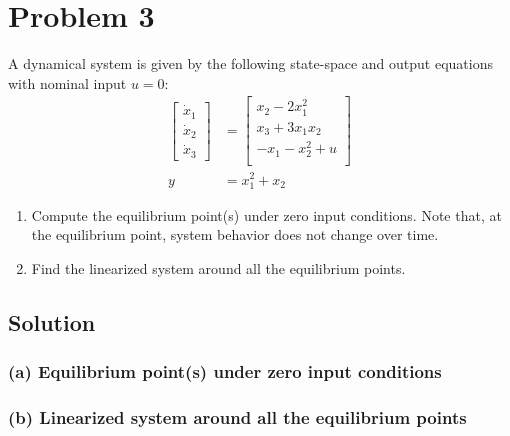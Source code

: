 \section*{Problem 3}

A dynamical system is given by the following state-space and output equations with nominal input \( u = 0\):
\begin{align*}
    \begin{bmatrix}
        \dot{x}_1 \\
        \dot{x}_2 \\
        \dot{x}_3
    \end{bmatrix}
      & =
    \begin{bmatrix}
        x_2 - 2 x_1^2    \\
        x_3 + 3 x_1 x_2  \\
        -x_1 - x_2^2 + u \\
    \end{bmatrix}
    \\
    y & = x_1^2 + x_2
\end{align*}

\begin{enumerate}[label= (\alph*)]
    \item Compute the equilibrium point(s) under zero input conditions.
          Note that, at the equilibrium point, system behavior does not change over time.
    \item Find the linearized system around all the equilibrium points.
\end{enumerate}

\subsection*{Solution}

\subsubsection*{(a) Equilibrium point(s) under zero input conditions}

\subsubsection*{(b) Linearized system around all the equilibrium points}

